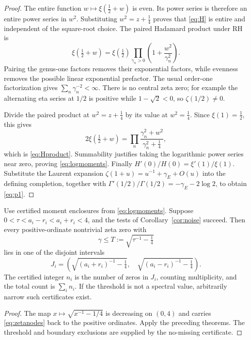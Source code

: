 \begin{proof}
The entire function $w\mapsto\xi(\tfrac12+w)$ is even. Its power series
is therefore an entire power series in $w^2$. Substituting $w^2=z+\tfrac14$
proves that \eqref{eq:H} is entire and independent of the square-root choice.
The paired Hadamard product under RH is
\[
 \xi(\tfrac12+w)=\xi(\tfrac12)
       \prod_{\gamma_n>0}\left(1+\frac{w^2}{\gamma_n^2}\right).
\]
Pairing the genus-one factors removes their exponential factors, while
evenness removes the possible linear exponential prefactor. The usual
order-one factorization gives $\sum_n\gamma_n^{-2}<\infty$. There is no
central zeta zero; for example the alternating eta series at $1/2$ is
positive while $1-\sqrt2<0$, so $\zeta(1/2)\ne0$.

Divide the paired product at $w^2=z+\tfrac14$ by its value at
$w^2=\tfrac14$. Since $\xi(1)=\tfrac12$, this gives
\[
 2\xi(\tfrac12+w)
 =\prod_n\frac{\gamma_n^2+w^2}{\gamma_n^2+\tfrac14},
\]
which is \eqref{eq:Hproduct}. Summability justifies taking the logarithmic
power series near zero, proving \eqref{eq:logmoments}. Finally
$H'(0)/H(0)=\xi'(1)/\xi(1)$. Substitute the Laurent expansion
$\zeta(1+u)=u^{-1}+\gamma_E+O(u)$ into the defining completion, together
with $\Gamma'(1/2)/\Gamma(1/2)=-\gamma_E-2\log2$, to obtain
\eqref{eq:p1}.
\end{proof}

\begin{corollary}\label{cor:zeta}
Use certified moment enclosures from \eqref{eq:logmoments}. Suppose
$0<\tau<a_i-r_i<a_i+r_i<4$, and the tests of
Corollary~\ref{cor:noise} succeed. Then every positive-ordinate nontrivial
zeta zero with
\[
 \gamma\le T:=\sqrt{\tau^{-1}-\tfrac14}
\]
lies in one of the disjoint intervals
\begin{equation}\label{eq:gammawindows}
 J_i=\left(
 \sqrt{(a_i+r_i)^{-1}-\tfrac14},\quad
 \sqrt{(a_i-r_i)^{-1}-\tfrac14}\right).
\end{equation}
The certified integer $n_i$ is the number of zeros in $J_i$, counting
multiplicity, and the total count is $\sum_i n_i$. If the threshold is not
a spectral value, arbitrarily narrow such certificates exist.
\end{corollary}
\begin{proof}
The map $x\mapsto\sqrt{x^{-1}-1/4}$ is decreasing on $(0,4)$ and carries
\eqref{eq:zetanodes} back to the positive ordinates. Apply the preceding
theorems. The threshold and boundary exclusions are supplied by the
no-missing certificate.
\end{proof}

